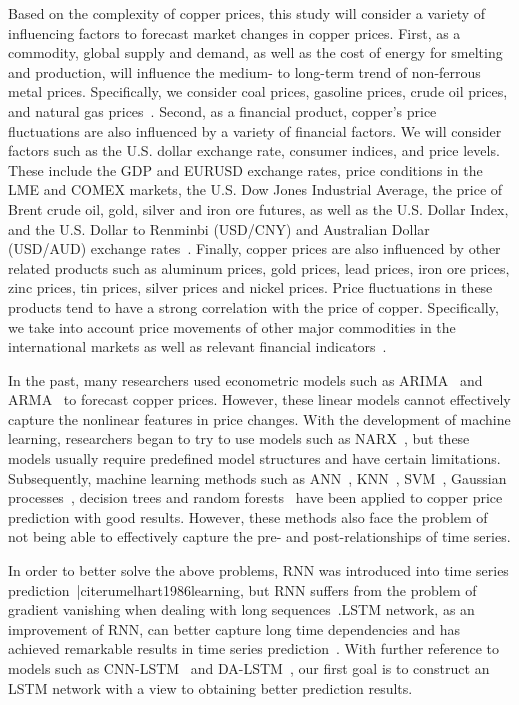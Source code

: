 \documentclass[project-plan]{report-template}
\begin{document}
\noindent Based on the complexity of copper prices, this study will consider a variety of influencing factors to forecast market changes in copper prices. First, as a commodity, global supply and demand, as well as the cost of energy for smelting and production, will influence the medium- to long-term trend of non-ferrous metal prices. Specifically, we consider coal prices, gasoline prices, crude oil prices, and natural gas prices~\cite{behmiri2015role}.
Second, as a financial product, copper's price fluctuations are also influenced by a variety of financial factors. We will consider factors such as the U.S. dollar exchange rate, consumer indices, and price levels. These include the GDP and EURUSD exchange rates, price conditions in the LME and COMEX markets, the U.S. Dow Jones Industrial Average, the price of Brent crude oil, gold, silver and iron ore futures, as well as the U.S. Dollar Index, and the U.S. Dollar to Renminbi (USD/CNY) and Australian Dollar (USD/AUD) exchange rates~\cite{frankel2010determinants, ciner2017predicting}.
Finally, copper prices are also influenced by other related products such as aluminum prices, gold prices, lead prices, iron ore prices, zinc prices, tin prices, silver prices and nickel prices. Price fluctuations in these products tend to have a strong correlation with the price of copper. Specifically, we take into account price movements of other major commodities in the international markets as well as relevant financial indicators~\cite{ozdemir2022medium, BUNCIC20151}.

\noindent In the past, many researchers used econometric models such as ARIMA~\cite{Asteriou2016ARIMAMA} and ARMA~\cite{whittle1951hypothesis} to forecast copper prices. However, these linear models cannot effectively capture the nonlinear features in price changes. With the development of machine learning, researchers began to try to use models such as NARX~\cite{lin1996learning, diaconescu2008use}, but these models usually require predefined model structures and have certain limitations. Subsequently, machine learning methods such as ANN~\cite{ZHANG2021102189}, KNN~\cite{altman1992introduction, chen2007narx}, SVM~\cite{cortes1995support}, Gaussian processes~\cite{frigola2013integrated}, decision trees and random forests~\cite{breiman2001random, diaz2020random} have been applied to copper price prediction with good results. However, these methods also face the problem of not being able to effectively capture the pre- and post-relationships of time series.

\noindent In order to better solve the above problems, RNN was introduced into time series prediction~|cite{rumelhart1986learning}, but RNN suffers from the problem of gradient vanishing when dealing with long sequences~\cite{bengio1994learning}.LSTM network, as an improvement of RNN, can better capture long time dependencies and has achieved remarkable results in time series prediction~\cite{hochreiter1997long}. With further reference to models such as CNN-LSTM~\cite{shi2015convolutional, 10159241} and DA-LSTM~\cite{qin2017dualstage}, our first goal is to construct an LSTM network with a view to obtaining better prediction results.
\end{document}

